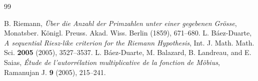 \documentclass[11pt,a4paper]{article}
\theoremstyle{definition}
\begin{document}
\begin{thebibliography}{99}

 B. Riemann, \emph{\"Uber die Anzahl der Primzahlen unter einer gegebenen Gr\"osse}, Monatsber. K\"onigl. Preuss. Akad. Wiss. Berlin (1859), 671--680.
 L. B\'aez-Duarte, \emph{A sequential Riesz-like criterion for the Riemann Hypothesis}, Int. J. Math. Math. Sci. \textbf{2005} (2005), 3527--3537.
 L. B\'aez-Duarte, M. Balazard, B. Landreau, and E. Saias, \emph{\'Etude de l'autorr\'elation multiplicative de la fonction de M\"obius}, Ramanujan J. \textbf{9} (2005), 215--241.

\end{thebibliography}
\end{document}
